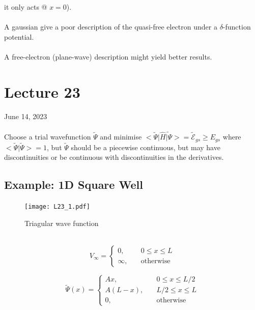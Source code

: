 \documentclass[12pt,fancychapters]{report}
\numberwithin{equation}{section}
\begin{document}
it only acts @ $x=0$).\\
\\
A gaussian give a poor description of the quasi-free electron under a $\delta$-function potential.\\
\\
A free-electron (plane-wave) description might yield better results.
\newpage
\section{Lecture 23}
June 14, 2023\\
\\
Choose a trial wavefunction $\tilde{\Psi}$ and minimise $\big<\tilde{\Psi}\big|\hat{H}\tilde{
\big|\Psi}\big> = \tilde{\mathcal{E}}_{gs} \geq E_{gs}$ where $\big<\tilde{\Psi}\big|\tilde
{\Psi}\big> = 1$, but $\tilde{\Psi}$ should be a piecewise continuous, but may have discontinuities 
or be continuous with discontinuities in the derivatives.

\subsection{Example: 1D Square Well}
\begin{figure}
  \begin{center}
\texttt{[image: L23\_1.pdf]}
  \end{center}
  \caption{Triagular wave function}
\end{figure}
\
\
\[
V_\infty =
\begin{cases}
  0, & \quad 0 \leq x \leq L\\
  \infty, & \quad \text{otherwise}
\end{cases}
\]

\[
  \tilde{\Psi} (x) = 
  \begin{cases}
    Ax, & \quad 0\leq x \leq L/2\\
    A(L-x), & \quad L/2 \leq x \leq L\\
    0, & \quad \text{otherwise}
  \end{cases}
\]
\end{document}
